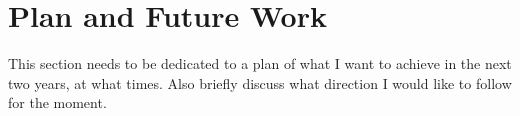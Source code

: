 \chapter{Plan and Future Work}\label{ch:future}
This section needs to be dedicated to a plan of what I want to achieve in the
next two years, at what times. Also briefly discuss what direction I would like
to follow for the moment.
